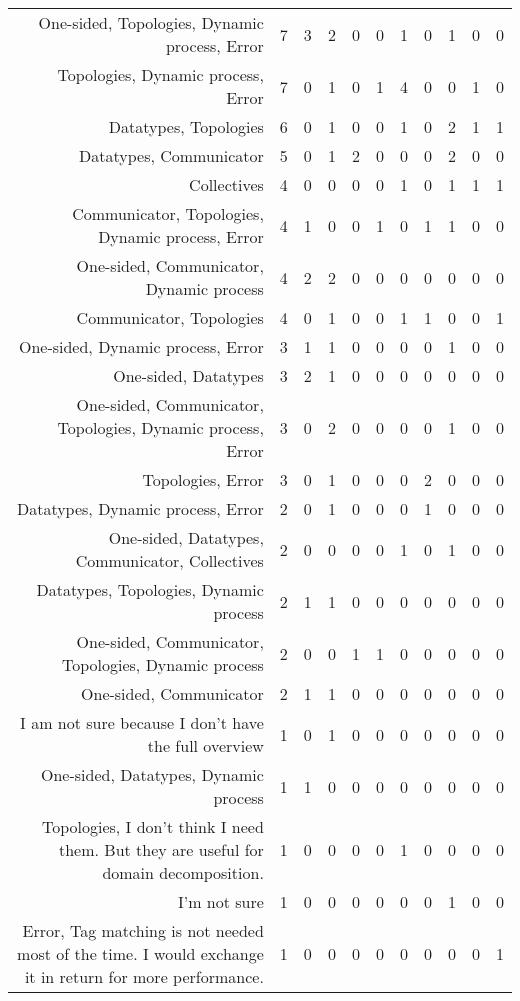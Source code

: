 {\begin{landscape}
\begin{longtable}[htb]{r|c|c|c|c|c|c|c|c|c|c}
{One-sided, Topologies, Dynamic process, Error} & 7 & 3 & 2 & 0 & 0 & 1 & 0 & 1 & 0 & 0 \\%
{Topologies, Dynamic process, Error} & 7 & 0 & 1 & 0 & 1 & 4 & 0 & 0 & 1 & 0 \\%
{Datatypes, Topologies} & 6 & 0 & 1 & 0 & 0 & 1 & 0 & 2 & 1 & 1 \\%
{Datatypes, Communicator} & 5 & 0 & 1 & 2 & 0 & 0 & 0 & 2 & 0 & 0 \\%
{Collectives} & 4 & 0 & 0 & 0 & 0 & 1 & 0 & 1 & 1 & 1 \\%
{Communicator, Topologies, Dynamic process, Error} & 4 & 1 & 0 & 0 & 1 & 0 & 1 & 1 & 0 & 0 \\%
{One-sided, Communicator, Dynamic process} & 4 & 2 & 2 & 0 & 0 & 0 & 0 & 0 & 0 & 0 \\%
{Communicator, Topologies} & 4 & 0 & 1 & 0 & 0 & 1 & 1 & 0 & 0 & 1 \\%
{One-sided, Dynamic process, Error} & 3 & 1 & 1 & 0 & 0 & 0 & 0 & 1 & 0 & 0 \\%
{One-sided, Datatypes} & 3 & 2 & 1 & 0 & 0 & 0 & 0 & 0 & 0 & 0 \\%
{One-sided, Communicator, Topologies, Dynamic process, Error} & 3 & 0 & 2 & 0 & 0 & 0 & 0 & 1 & 0 & 0 \\%
{Topologies, Error} & 3 & 0 & 1 & 0 & 0 & 0 & 2 & 0 & 0 & 0 \\%
{Datatypes, Dynamic process, Error} & 2 & 0 & 1 & 0 & 0 & 0 & 1 & 0 & 0 & 0 \\%
{One-sided, Datatypes, Communicator, Collectives} & 2 & 0 & 0 & 0 & 0 & 1 & 0 & 1 & 0 & 0 \\%
{Datatypes, Topologies, Dynamic process} & 2 & 1 & 1 & 0 & 0 & 0 & 0 & 0 & 0 & 0 \\%
{One-sided, Communicator, Topologies, Dynamic process} & 2 & 0 & 0 & 1 & 1 & 0 & 0 & 0 & 0 & 0 \\%
{One-sided, Communicator} & 2 & 1 & 1 & 0 & 0 & 0 & 0 & 0 & 0 & 0 \\%
{I am not sure because I don't have the full overview} & 1 & 0 & 1 & 0 & 0 & 0 & 0 & 0 & 0 & 0 \\%
{One-sided, Datatypes, Dynamic process} & 1 & 1 & 0 & 0 & 0 & 0 & 0 & 0 & 0 & 0 \\%
{Topologies, I don't think I need them. But they are useful for domain decomposition.} & 1 & 0 & 0 & 0 & 0 & 1 & 0 & 0 & 0 & 0 \\%
{I'm not sure} & 1 & 0 & 0 & 0 & 0 & 0 & 0 & 1 & 0 & 0 \\%
{Error, Tag matching is not needed most of the time. I would exchange it in return for more performance.} & 1 & 0 & 0 & 0 & 0 & 0 & 0 & 0 & 0 & 1 \\%

\end{longtable}
\end{landscape}}
